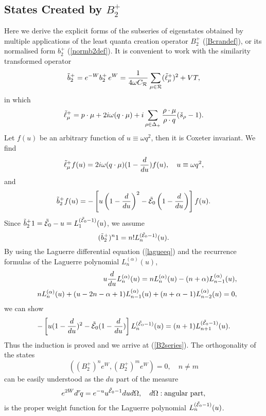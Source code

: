 \documentclass[a4paper,12pt]{article}
\begin{document}
\subsection{States Created by \(B_2^+\)}
\label{B2plus}

Here we derive the explicit forms of the subseries of eigenstates obtained
by multiple applications of the least quanta creation operator \(B_2^+\)
(\ref{Bcrandef}), or its normalised form \(b_2^+\) (\ref{normb2def}).
It is convenient to work with the similarity transformed operator
\begin{equation}
   \tilde{b}_2^+=e^{-W}b_2^+\,e^W={1\over{4\omega C_{\cal
   R}}}\sum_{\mu\in{\cal R}}(\tilde{\ell}_{\mu}^+)^2+VT,
\end{equation}
in which
\begin{equation}
   \tilde{\ell}_{\mu}^+=
   p\cdot\mu+2i\omega(q\cdot\mu)+i\sum_{\rho\in\Delta_+}
   {\rho\cdot\mu\over{\rho\cdot q}}(\check{s}_{\rho}-1).
\end{equation}
Let \(f(u)\) be an arbitrary function of \(u\equiv\omega q^2\), then it is
Coxeter invariant.
We find
\begin{equation}
   \tilde{\ell}_{\mu}^+f(u)=2i\omega(q\cdot\mu)(1-{d\over{du}})f(u),\quad
   u\equiv\omega q^2,
\end{equation}
and
\begin{equation}
   \tilde{b}_2^+f(u)=-\left[u\left(1-{d\over{du}}\right)^2
   -\tilde{\cal E}_0\left(1-{d\over{du}}\right)\right]f(u).
\end{equation}
Since \(\tilde{b}_2^+1=\tilde{\cal E}_0-u=L_1^{(\tilde{\cal E}_0-1)}(u)\),
we
assume
\begin{equation}
   (\tilde{b}_2^+)^n1=n!L_n^{(\tilde{\cal E}_0-1)}(u).
\end{equation}
By using the Laguerre differential equation (\ref{lagueeq})
and the recurrence formulas of
the Laguerre polynomial \(L_n^{(\alpha)}(u)\),
\begin{eqnarray}
   &&u{d\over{du}}L^{(\alpha)}_n(u)=nL^{(\alpha)}_n(u)
   -(n+\alpha)L^{(\alpha)}_{n-1}(u),\\
   &&nL^{(\alpha)}_n(u)+(u-2n-\alpha+1)L^{(\alpha)}_{n-1}(u)
   +(n+\alpha-1)L^{(\alpha)}_{n-2}(u)=0,
\end{eqnarray}
we can show
\begin{equation}
   -\left[u(1-{d\over{du}})^2-\tilde{\cal E}_0(1-{d\over{du}})
   \right]L_n^{(\tilde{\cal
   E}_0-1)}(u)=(n+1)L_{n+1}^{(\tilde{\cal E}_0-1)}(u).
\end{equation}
Thus the induction is proved and we arrive at (\ref{B2series}).
The orthogonality of the states
\begin{equation}
   \left((B_2^+)^ne^W,(B_2^+)^me^W\right)=0,\quad n\neq m
\end{equation}
can be easily understood as the \(du\) part of the measure
\[
   e^{2W}d^r\!q= e^{-u}u^{\tilde{\cal E}_0-1}dud\Omega,
   \quad d\Omega: \mbox{angular
   part},
\]
is the proper weight function for the Laguerre polynomial
\(L_n^{(\tilde{\cal E}_0-1)}(u)\).
\end{document}
